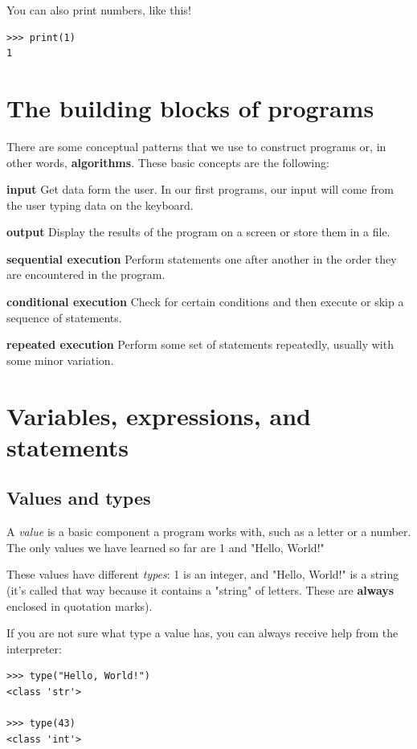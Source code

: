 You can also print numbers, like this!
\begin{verbatim}
>>> print(1)
1
\end{verbatim}

\section{The building blocks of programs}
There are some conceptual patterns that we use to construct programs or, in other words, \textbf{algorithms}. These basic concepts are the following:

\textbf{input} Get data form the user. In our first programs, our input will come from the user typing data on the keyboard.

\textbf{output} Display the results of the program on a screen or store them in a file.

\textbf{sequential execution} Perform statements one after another in the order they are encountered in the program.

\textbf{conditional execution} Check for certain conditions and then execute or skip a sequence of statements.

\textbf{repeated execution} Perform some set of statements repeatedly, usually with some minor variation.

\section{Variables, expressions, and statements}
\subsection{Values and types}
A \textit{value} is a basic component a program works with, such as a letter or a number. The only values we have learned so far are 1 and "Hello, World!"

These values have different \textit{types}: 1 is an integer, and "Hello, World!" is a string (it's called that way because it contains a "string" of letters. These are \textbf{always} enclosed in quotation marks).

If you are not sure what type a value has, you can always receive help from the interpreter:
\begin{verbatim}
>>> type("Hello, World!")
<class 'str'>

>>> type(43)
<class 'int'>

\end{verbatim}

